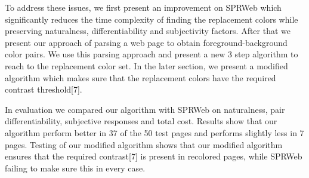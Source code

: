 To address these issues, we first present an improvement on SPRWeb which significantly reduces the time complexity of finding the replacement colors while preserving naturalness, differentiability and subjectivity factors. After that we present our approach of parsing a web page to obtain foreground-background color pairs. We use this parsing approach and present a new 3 step algorithm to reach to the replacement color set. In the later section, we present a modified algorithm which makes sure that the replacement colors have the required contrast threshold[7]. 

In evaluation we compared our algorithm with SPRWeb on naturalness, pair differentiability, subjective responses and total cost. Results show that our algorithm perform better in 37 of the 50 test pages and performs slightly less in 7 pages. Testing of our modified algorithm shows that our modified algorithm ensures that the required contrast[7] is present in recolored pages, while SPRWeb failing to make sure this in every case.   	